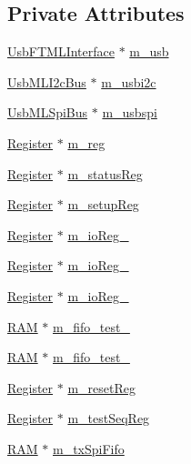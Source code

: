 \subsection*{Private Attributes}
\begin{DoxyCompactItemize}
\item 
\hyperlink{classUsbFTMLInterface}{Usb\+F\+T\+M\+L\+Interface} $\ast$ \hyperlink{classFePGA_afb7947e600a66d914ee524acec3d8b1f}{m\+\_\+usb}
\item 
\hyperlink{classUsbMLI2cBus}{Usb\+M\+L\+I2c\+Bus} $\ast$ \hyperlink{classFePGA_a09fdde4002008daa0d15672772dd4483}{m\+\_\+usbi2c}
\item 
\hyperlink{classUsbMLSpiBus}{Usb\+M\+L\+Spi\+Bus} $\ast$ \hyperlink{classFePGA_a922a56250b29c9842cdb8095cae8c976}{m\+\_\+usbspi}
\item 
\hyperlink{classRegister}{Register} $\ast$ \hyperlink{classFePGA_afdbe1ea67182ffdaaf62116d66839ad7}{m\+\_\+reg}
\item 
\hyperlink{classRegister}{Register} $\ast$ \hyperlink{classFePGA_ad8c66e956d4f4163ae4dcb966d3ebeed}{m\+\_\+status\+Reg}
\item 
\hyperlink{classRegister}{Register} $\ast$ \hyperlink{classFePGA_a0255fe229013986b4387c3a75ddf4e97}{m\+\_\+setup\+Reg}
\item 
\hyperlink{classRegister}{Register} $\ast$ \hyperlink{classFePGA_a9a3a8d338e264c0ccb51e01178b48bd1}{m\+\_\+io\+Reg\+\_}
\item 
\hyperlink{classRegister}{Register} $\ast$ \hyperlink{classFePGA_aaf91054fbe6367cd044b6856098c781b}{m\+\_\+io\+Reg\+\_}
\item 
\hyperlink{classRegister}{Register} $\ast$ \hyperlink{classFePGA_a634d74bc7104816d7ef1bbe816bdf366}{m\+\_\+io\+Reg\+\_}
\item 
\hyperlink{classRAM}{R\+AM} $\ast$ \hyperlink{classFePGA_af911fcb4fc76acd553e9a492174f134b}{m\+\_\+fifo\+\_\+test\+\_}
\item 
\hyperlink{classRAM}{R\+AM} $\ast$ \hyperlink{classFePGA_ad42013742385c695067b466c933665c9}{m\+\_\+fifo\+\_\+test\+\_}
\item 
\hyperlink{classRegister}{Register} $\ast$ \hyperlink{classFePGA_aeff1a2370237a06b50e1ae23d933c862}{m\+\_\+reset\+Reg}
\item 
\hyperlink{classRegister}{Register} $\ast$ \hyperlink{classFePGA_a67bc3c8f923b673100974fd86096393e}{m\+\_\+test\+Seq\+Reg}
\item 
\hyperlink{classRAM}{R\+AM} $\ast$ \hyperlink{classFePGA_a5b3e4deb73a882e6f044450d8a733558}{m\+\_\+tx\+Spi\+Fifo}

\end{DoxyCompactItemize}
